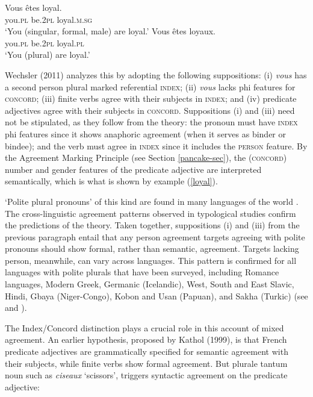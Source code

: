 \documentclass[output=paper]{langsci/langscibook}
\begin{document}
\begin{exe} 
\ex\label{loyal}
\begin{xlist}
\ex
\gll   Vous		\^{e}tes		loyal. \\
		you.\textsc{pl}		be.\textsc{2pl}	loyal.\textsc{m.sg} \\
\glt		‘You (singular, formal, male) are loyal.’ 
\ex 
\gll	Vous		\^{e}tes		loyaux. \\
		you.\textsc{pl}		be.\textsc{2pl}	loyal.\textsc{pl} \\
\glt		‘You (plural) are loyal.’  
\end{xlist}
\end{exe}

\noindent
Wechsler (2011) analyzes this by adopting the following suppositions: (i) \textit{vous} has a  second person plural marked referential  \textsc{index}; (ii) \textit{vous} lacks phi features for \textsc{concord}; (iii) finite verbs agree with their subjects in \textsc{index}; and (iv) predicate adjectives agree with their subjects in \textsc{concord}.  Suppositions (i) and (iii) need not be stipulated, as they follow from the theory:  the pronoun must have \textsc{index} phi features since it shows anaphoric agreement (when it serves as binder or bindee); and the verb must agree in \textsc{index} since it includes the \textsc{person} feature.  By the Agreement Marking Principle (see Section \ref{pancake-sec}), the (\textsc{concord}) number and gender features of the predicate adjective are interpreted semantically, which is what is shown by example (\ref{loyal}). 

`Polite plural pronouns' of this kind are found in many languages of the world \citep{Head:1978}.   The cross-linguistic agreement patterns observed in typological studies \citep{Comrie:1975,Wechsler:2011} confirm the predictions of the theory.  Taken together, suppositions (i) and (iii) from the previous paragraph entail that any person agreement targets agreeing with polite pronouns should show formal, rather than semantic, agreement.  Targets lacking person, meanwhile, can vary across languages.  This pattern is confirmed for all languages with polite plurals that have been surveyed, including Romance languages, Modern Greek, Germanic (Icelandic), West, South and East Slavic, Hindi, Gbaya (Niger-Congo),  Kobon and Usan (Papuan), and Sakha (Turkic) (see \cite{Comrie:1975} and \cite{Wechsler:2011}).   
 
The Index/Concord distinction plays a crucial role in this account of mixed agreement.  An earlier hypothesis, proposed by Kathol (1999), is that French predicate adjectives are grammatically specified for semantic  agreement with their subjects, while finite verbs show formal agreement.  But plurale tantum noun such as \textit{ciseaux} ‘scissors’, triggers syntactic agreement on the predicate adjective:
	
\end{document}
